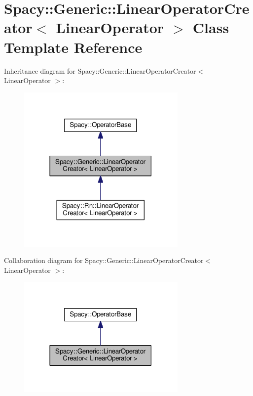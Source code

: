 \hypertarget{classSpacy_1_1Generic_1_1LinearOperatorCreator}{}\section{Spacy\+:\+:Generic\+:\+:Linear\+Operator\+Creator$<$ Linear\+Operator $>$ Class Template Reference}
\label{classSpacy_1_1Generic_1_1LinearOperatorCreator}


Inheritance diagram for Spacy\+:\+:Generic\+:\+:Linear\+Operator\+Creator$<$ Linear\+Operator $>$\+:
\nopagebreak
\begin{figure}[H]
\begin{center}
\leavevmode
\includegraphics[width=234pt]{classSpacy_1_1Generic_1_1LinearOperatorCreator__inherit__graph}
\end{center}
\end{figure}


Collaboration diagram for Spacy\+:\+:Generic\+:\+:Linear\+Operator\+Creator$<$ Linear\+Operator $>$\+:
\nopagebreak
\begin{figure}[H]
\begin{center}
\leavevmode
\includegraphics[width=234pt]{classSpacy_1_1Generic_1_1LinearOperatorCreator__coll__graph}
\end{center}
\end{figure}
